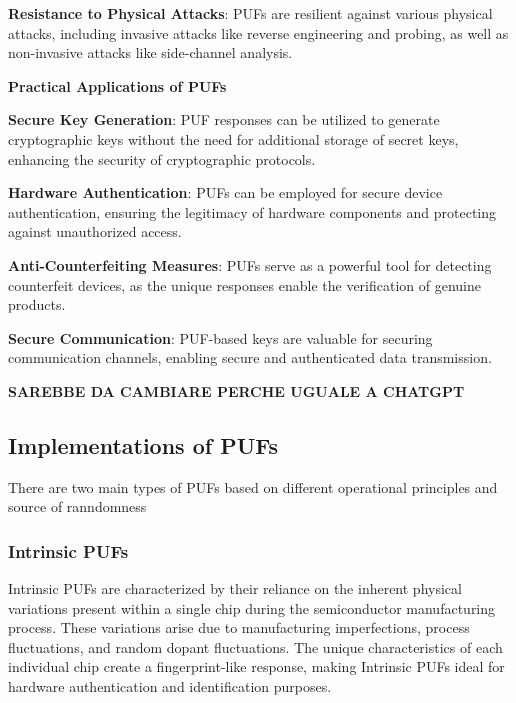 \documentclass{article}
\begin{document}
\textbf{Resistance to Physical Attacks}: PUFs are resilient against various physical attacks, including invasive attacks like reverse engineering and probing, as well as non-invasive attacks like side-channel analysis.


\textbf{Practical Applications of PUFs}


\textbf{Secure Key Generation}: PUF responses can be utilized to generate cryptographic keys without the need for additional storage of secret keys, enhancing the security of cryptographic protocols.


\textbf{Hardware Authentication}: PUFs can be employed for secure device authentication, ensuring the legitimacy of hardware components and protecting against unauthorized access.


\textbf{Anti-Counterfeiting Measures}: PUFs serve as a powerful tool for detecting counterfeit devices, as the unique responses enable the verification of genuine products.


\textbf{Secure Communication}: PUF-based keys are valuable for securing communication channels, enabling secure and authenticated data transmission.



\textbf{ SAREBBE DA CAMBIARE PERCHE UGUALE A CHATGPT}
\subsection{Implementations of PUFs}
There are two main types of PUFs based on different operational principles and source of ranndomness
\subsubsection{Intrinsic PUFs}

Intrinsic PUFs are characterized by their reliance on the inherent physical variations present within a single chip during the semiconductor manufacturing process. These variations arise due to manufacturing imperfections, process fluctuations, and random dopant fluctuations. The unique characteristics of each individual chip create a fingerprint-like response, making Intrinsic PUFs ideal for hardware authentication and identification purposes.
\end{document}
